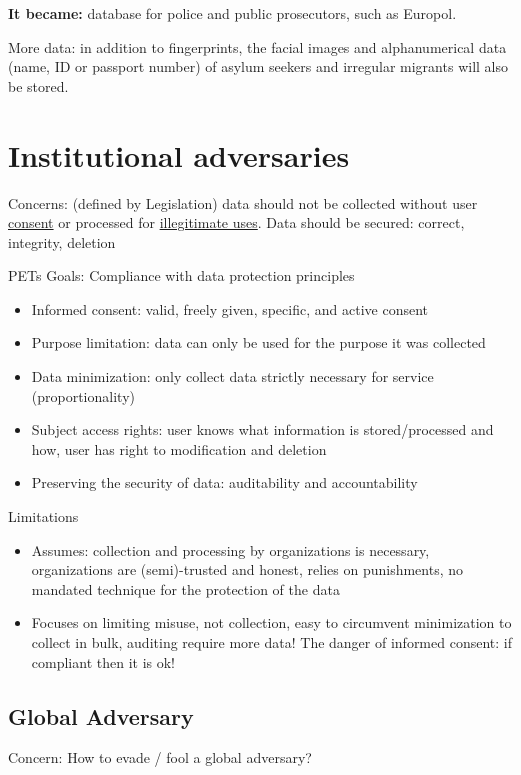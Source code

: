 \documentclass[11pt]{article}
\begin{document}
\textbf{It became:} database for police and public prosecutors, such as Europol. 

More data: in addition to fingerprints, the facial images and alphanumerical data (name, ID or passport number) of asylum seekers and irregular migrants will also be stored. 

\section*{Institutional adversaries}

Concerns: (defined by Legislation) data should not be collected without user \underline{consent} or processed for \underline{illegitimate uses}. Data should be secured: correct, integrity, deletion

PETs Goals: Compliance with data protection principles
\begin{itemize}
	\item Informed consent: valid, freely given, specific, and active consent
	\item Purpose limitation: data can only be used for the purpose it was collected
	\item Data minimization: only collect data strictly necessary for service (proportionality)
	\item Subject access rights: user knows what information is stored/processed and how, user has right to modification and deletion
	\item Preserving the security of data: auditability and accountability 
\end{itemize}

Limitations
\begin{itemize}
	\item Assumes: collection and processing by organizations is necessary, organizations are (semi)-trusted and honest, relies on punishments, no mandated technique for the protection of the data
	\item Focuses on limiting misuse, not collection, easy to circumvent minimization to collect in bulk, auditing require more data! The danger of informed consent: if compliant then it is ok!
\end{itemize}

\subsection*{Global Adversary}

Concern: How to evade / fool a global adversary?
\end{document}
